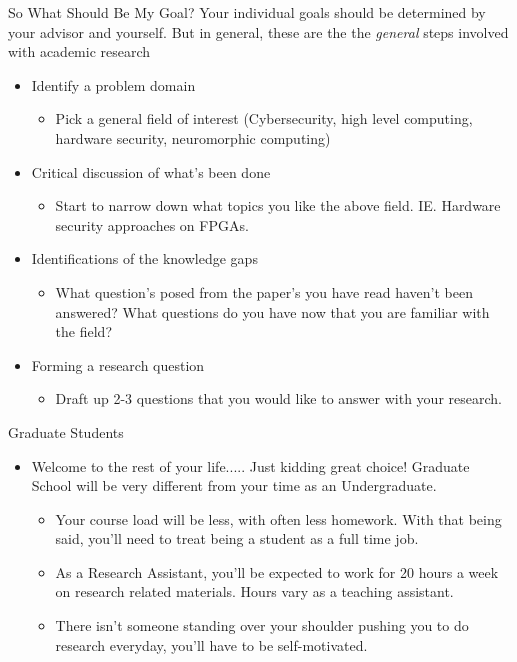 \documentclass[handout]{beamer}
\begin{document}
\begin{frame}{So What Should Be My Goal?}
Your individual goals should be determined by your advisor and yourself. But in general, these are the the \textit{general} steps involved with academic research
\begin{itemize}
  \item Identify a problem domain
  \begin{itemize}
      \item Pick a general field of interest (Cybersecurity, high level computing, hardware security, neuromorphic computing)
  \end{itemize}
  \item Critical discussion of what's been done
  \begin{itemize}
      \item Start to narrow down what topics you like the above field. IE. Hardware security approaches on FPGAs.
  \end{itemize}
  \item Identifications of the knowledge gaps
  \begin{itemize}
      \item What question's posed from the paper's you have read haven't been answered? What questions do you have now that you are familiar with the field?
  \end{itemize}
  \item Forming a research question
  \begin{itemize}
      \item Draft up 2-3 questions that you would like to answer with your research. 
  \end{itemize}
\end{itemize}
\end{frame}

\begin{frame}{Graduate Students}
\begin{itemize}
  \item Welcome to the rest of your life..... Just kidding great choice! Graduate School will be very different from your time as an Undergraduate.
  \begin{itemize}
      \item Your course load will be less, with often less homework. With that being said, you'll need to treat being a student as a full time job. 
      \item As a Research Assistant, you'll be expected to work for 20 hours a week on research related materials. Hours vary as a teaching assistant.
      \item There isn't someone standing over your shoulder pushing you to do research everyday, you'll have to be self-motivated.
  \end{itemize}
\end{itemize}
\end{frame}
\end{document}
